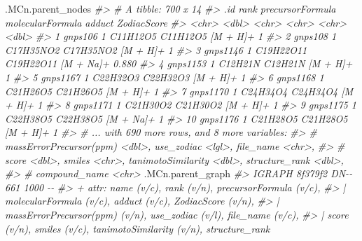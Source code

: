 \documentclass[]{tufte-handout}
\newenvironment{Shaded}{}{}
\newcommand{\CommentTok}[1]{\textcolor[rgb]{0.38,0.63,0.69}{\textit{#1}}}
\newcommand{\NormalTok}[1]{#1}
\begin{document}
\begin{Shaded}
\begin{Highlighting}[]
\NormalTok{.MCn.parent\_nodes}
\CommentTok{\#\textgreater{} \# A tibble: 700 x 14}
\CommentTok{\#\textgreater{}    .id       rank precursorFormula molecularFormula adduct    ZodiacScore}
\CommentTok{\#\textgreater{}    \textless{}chr\textgreater{}    \textless{}dbl\textgreater{} \textless{}chr\textgreater{}            \textless{}chr\textgreater{}            \textless{}chr\textgreater{}           \textless{}dbl\textgreater{}}
\CommentTok{\#\textgreater{}  1 gnps106      1 C11H12O5         C11H12O5         [M + H]+        1    }
\CommentTok{\#\textgreater{}  2 gnps108      1 C17H35NO2        C17H35NO2        [M + H]+        1    }
\CommentTok{\#\textgreater{}  3 gnps1146     1 C19H22O11        C19H22O11        [M + Na]+       0.880}
\CommentTok{\#\textgreater{}  4 gnps1153     1 C12H21N          C12H21N          [M + H]+        1    }
\CommentTok{\#\textgreater{}  5 gnps1167     1 C22H32O3         C22H32O3         [M + H]+        1    }
\CommentTok{\#\textgreater{}  6 gnps1168     1 C21H26O5         C21H26O5         [M + H]+        1    }
\CommentTok{\#\textgreater{}  7 gnps1170     1 C24H34O4         C24H34O4         [M + H]+        1    }
\CommentTok{\#\textgreater{}  8 gnps1171     1 C21H30O2         C21H30O2         [M + H]+        1    }
\CommentTok{\#\textgreater{}  9 gnps1175     1 C22H38O5         C22H38O5         [M + Na]+       1    }
\CommentTok{\#\textgreater{} 10 gnps1176     1 C21H28O5         C21H28O5         [M + H]+        1    }
\CommentTok{\#\textgreater{} \# ... with 690 more rows, and 8 more variables:}
\CommentTok{\#\textgreater{} \#   \textasciigrave{}massErrorPrecursor(ppm)\textasciigrave{} \textless{}dbl\textgreater{}, use\_zodiac \textless{}lgl\textgreater{}, file\_name \textless{}chr\textgreater{},}
\CommentTok{\#\textgreater{} \#   score \textless{}dbl\textgreater{}, smiles \textless{}chr\textgreater{}, tanimotoSimilarity \textless{}dbl\textgreater{}, structure\_rank \textless{}dbl\textgreater{},}
\CommentTok{\#\textgreater{} \#   compound\_name \textless{}chr\textgreater{}}
\NormalTok{.MCn.parent\_graph}
\CommentTok{\#\textgreater{} IGRAPH 8f379f2 DN{-}{-} 661 1000 {-}{-} }
\CommentTok{\#\textgreater{} + attr: name (v/c), rank (v/n), precursorFormula (v/c),}
\CommentTok{\#\textgreater{} | molecularFormula (v/c), adduct (v/c), ZodiacScore (v/n),}
\CommentTok{\#\textgreater{} | massErrorPrecursor(ppm) (v/n), use\_zodiac (v/l), file\_name (v/c),}
\CommentTok{\#\textgreater{} | score (v/n), smiles (v/c), tanimotoSimilarity (v/n), structure\_rank}

\end{Highlighting}
\end{Shaded}
\end{document}
